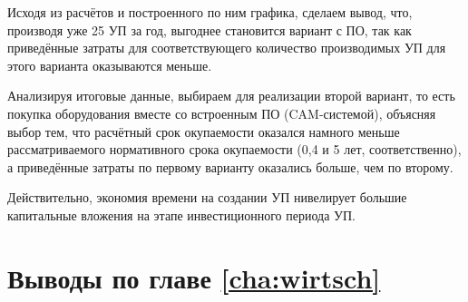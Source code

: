 Исходя из расчётов и построенного по ним графика, сделаем вывод, что, производя уже 25 УП за год, выгоднее становится вариант с ПО, так как приведённые затраты для соответствующего количество производимых УП для этого варианта оказываются меньше.

Анализируя итоговые данные, выбираем для реализации второй вариант, то есть покупка оборудования вместе со встроенным ПО (CAM-системой), объясняя выбор тем, что расчётный срок окупаемости оказался намного меньше рассматриваемого нормативного срока окупаемости (0,4 и 5 лет, соответственно), а приведённые затраты по первому варианту оказались больше, чем по второму.

Действительно, экономия времени на создании УП нивелирует большие капитальные вложения на этапе инвестиционного периода УП.

\section{Выводы по главе \ref{cha:wirtsch}}

